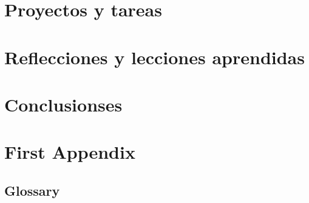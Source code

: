 \documentclass[pdftex,spanish]{pucthesis}	%
\begin{document}
\chapter[PROYECTOS Y TAREAS]{Proyectos y tareas} \label{ch2}


\chapter[REFLECCIONES Y LECCIONES APRENDIDAS]{Reflecciones y lecciones aprendidas} \label{ch3}


\chapter[CONCLUSIONSES]{Conclusionses}





\cleardoublepage
{} \label{references}
\renewcommand{\bibname}{REFERENCIAS}



\printbibliography


\makeatletter
\renewcommand{\appendix}{%
  \setcounter{chapter}{0}%
  \renewcommand\@chapapp{\appendixname}%
  \renewcommand\thechapter{\@Alph\c@chapter}%
}
\makeatother

\appendix
\chapter[First Appendix]{First Appendix}


\newpage
\section[Glossary]{Glossary}
\printglossary[title=Glossary]
\end{document}
